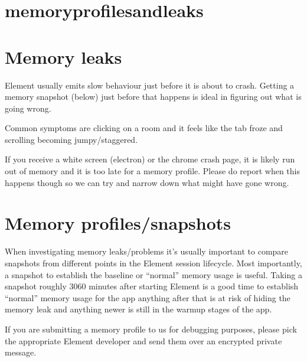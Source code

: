 \documentclass[letterpaper,10pt,openany,oneside,english]{sphinxmanual}
\begin{document}
\chapter{memory\sphinxhyphen{}profiles\sphinxhyphen{}and\sphinxhyphen{}leaks}
\label{\detokenize{memory-profiles-and-leaks:memory-profiles-and-leaks}}\label{\detokenize{memory-profiles-and-leaks::doc}}

\chapter{Memory leaks}
\label{\detokenize{memory-profiles-and-leaks:memory-leaks}}
\sphinxAtStartPar
Element usually emits slow behaviour just before it is about to crash. Getting a
memory snapshot (below) just before that happens is ideal in figuring out what
is going wrong.

\sphinxAtStartPar
Common symptoms are clicking on a room and it feels like the tab froze and scrolling
becoming jumpy/staggered.

\sphinxAtStartPar
If you receive a white screen (electron) or the chrome crash page, it is likely
run out of memory and it is too late for a memory profile. Please do report when
this happens though so we can try and narrow down what might have gone wrong.


\chapter{Memory profiles/snapshots}
\label{\detokenize{memory-profiles-and-leaks:memory-profiles-snapshots}}
\sphinxAtStartPar
When investigating memory leaks/problems it’s usually important to compare snapshots
from different points in the Element session lifecycle. Most importantly, a snapshot
to establish the baseline or “normal” memory usage is useful. Taking a snapshot
roughly 30\sphinxhyphen{}60 minutes after starting Element is a good time to establish “normal”
memory usage for the app \sphinxhyphen{} anything after that is at risk of hiding the memory leak
and anything newer is still in the warmup stages of the app.

\sphinxAtStartPar
{} If you are submitting a memory
profile to us for debugging purposes, please pick the appropriate Element developer and
send them over an encrypted private message. 
\end{document}
